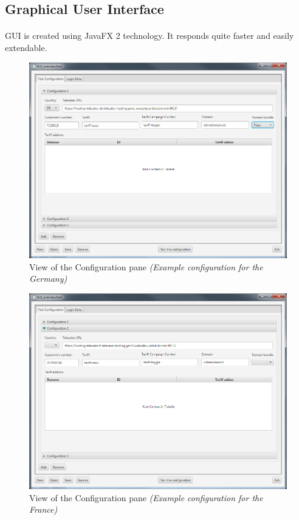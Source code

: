 \subsection{Graphical User Interface}

\paragraph{}GUI is created using JavaFX 2 technology. It responds quite faster and easily  extendable.

\begin{figure}[h!]
\centering
\includegraphics[width=\textwidth]{gui_batch_de.png}
\caption{View of the Configuration pane \textit{(Example configuration for the Germany)}}
\end{figure}

\begin{figure}[h!]
\centering
\includegraphics[width=\textwidth]{gui_batch_fr.png}
\caption{View of the Configuration pane \textit{(Example configuration for the France)}}
\end{figure}

